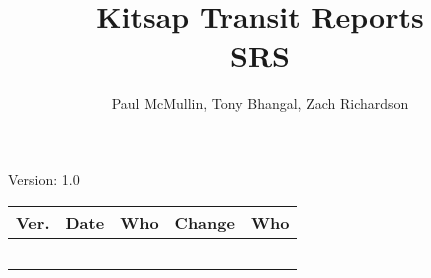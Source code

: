 \documentclass[letterpaper,12pt]{article}
\title{Kitsap Transit Reports\\SRS}
\author{Paul McMullin, Tony Bhangal, Zach Richardson}
\begin{document}
\maketitle

\begin{center}
  Version: 1.0
\end{center}

\vfill
\begin{tabularx}{\linewidth}{|l|l|l|X|l|}\hline
Ver. & Date & Who & Change & Who \\\hline
     &      &     &        &     \\\hline
     &      &     &        &     \\\hline
     &      &     &        &     \\\hline
     &      &     &        &     \\\hline
     &      &     &        &     \\\hline
\end{tabularx}
\newpage







\end{document}
